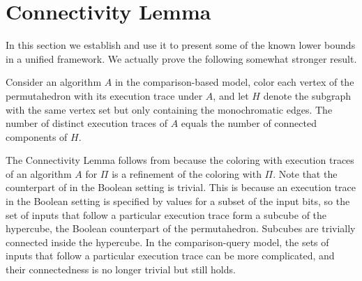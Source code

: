 \documentclass{toc}
\begin{document}
\section{Connectivity Lemma}
\label{sec:connectivity}

In this section we establish  and use it to present some of the known lower bounds in a unified framework. We actually prove the following somewhat stronger result.

\begin{lemma}\label{lemma:connectivity:strong}
Consider an algorithm $A$ in the comparison-based model, color each vertex of the permutahedron with its execution trace under $A$, and let $H$ denote the subgraph with the same vertex set but only containing the monochromatic edges. The number of distinct execution traces of $A$ equals the number of connected components of $H$.
\end{lemma}
The Connectivity Lemma follows from  because the coloring with execution traces of an algorithm $A$ for $\Pi$ is a refinement of the coloring with $\Pi$. Note that the counterpart of  in the Boolean setting is trivial. This is because an execution trace in the Boolean setting is specified by values for a subset of the input bits, so the set of inputs that follow a particular execution trace form a subcube of the hypercube, the Boolean counterpart of the permutahedron. Subcubes are trivially connected inside the hypercube. In the comparison-query model, the sets of inputs that follow a particular execution trace can be more complicated, and their connectedness is no longer trivial but still holds.
\end{document}
